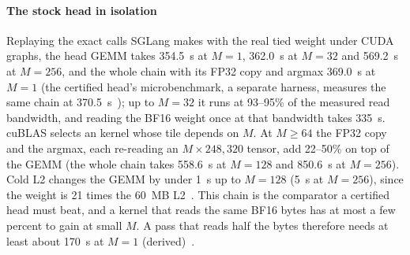 \paragraph{The stock head in isolation} Replaying the exact calls SGLang makes with the real tied weight under CUDA graphs, the head GEMM takes 354.5~\textmu s at $M=1$, 362.0~\textmu s at $M=32$ and 569.2~\textmu s at $M=256$, and the whole chain with its FP32 copy and argmax 369.0~\textmu s at $M=1$ (the certified head's microbenchmark, a separate harness, measures the same chain at 370.5~\textmu s~); up to $M=32$ it runs at 93--95\% of the measured read bandwidth, and reading the BF16 weight once at that bandwidth takes 335~\textmu s. cuBLAS selects an  kernel whose tile depends on $M$. At $M\ge64$ the FP32 copy and the argmax, each re-reading an $M\times248{,}320$ tensor, add 22--50\% on top of the GEMM (the whole chain takes 558.6~\textmu s at $M=128$ and 850.6~\textmu s at $M=256$). Cold L2 changes the GEMM by under 1~\textmu s up to $M=128$ (5~\textmu s at $M=256$), since the weight is 21 times the 60~MB L2~. This chain is the comparator a certified head must beat, and a kernel that reads the same BF16 bytes has at most a few percent to gain at small $M$. A pass that reads half the bytes therefore needs at least about 170~\textmu s at $M=1$ (derived)~.

